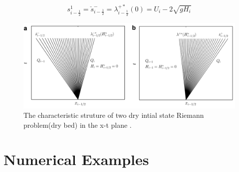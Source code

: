 \documentclass[12pt,a4paper]{article}
\begin{document}
	\begin{equation}
		s_{i-\frac{1}{2}}^{1} = \check{s}_{i-\frac{1}{2}}^{-} = \lambda_{i-\frac{1}{2}}^{+*}(0)= U_{i} - 2\sqrt{gH_{i}}
		\label{wd1}
	\end{equation}
	
	\begin{figure}[H]
		\centering
		\includegraphics[width=.95\linewidth]{images/wet-dry}
		\caption{ The characteristic struture of  two dry intial state Riemann problem(dry bed) in the x-t plane \cite{ge:2008}.}
		\label{fig:wet-dry}
	\end{figure}
	
	
	
	\section{Numerical Examples}



	
	
	
\end{document}
